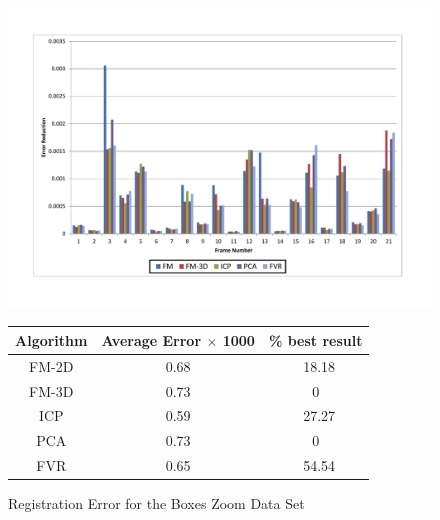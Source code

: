 \begin{figure}
\centering
\includegraphics[width=6in]{images/results/Boxes_Texture_ZoomOut}
\caption{Registration Error for the Boxes Zoom Data Set}
\label{fig:PET3}

\begin{tabular}{ccc}
\hline
\textbf{Algorithm} & \textbf{Average Error $\times$ 1000} & \textbf{\% best result}\\ \hline
FM-2D	& 0.68 & ~18.18\\
FM-3D	& 0.73 & 0\\
ICP		& 0.59 & ~27.27\\
PCA		& 0.73 & 0\\
FVR		& 0.65 & ~54.54\\
\end{tabular}
\end{figure} 

